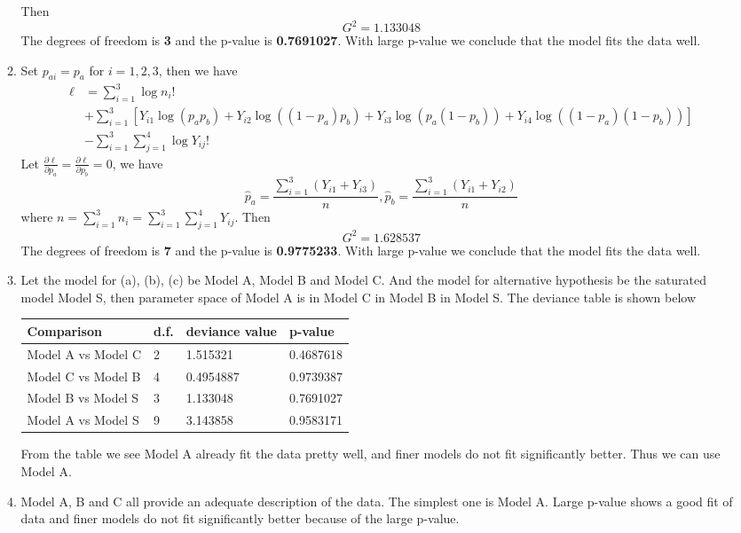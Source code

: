 \documentclass{article}
\begin{document}
\begin{enumerate}[leftmargin = 0 em, label = \arabic*., font = \bfseries]
\begin{enumerate}
		 Then 
		 \[G^2 = 1.133048\]
		 The degrees of freedom is \textbf{3} and the p-value is \textbf{0.7691027}. With large p-value we conclude that the model fits the data well.
		 
		\item 
		Set $p_{ai} = p_{a}$ for $i = 1,2,3$, then we have
		\begin{align*}
		 \ell &= \sum_{i=1}^3 \log n_i! \\
		 & + \sum_{i=1}^3 \left[Y_{i1} \log (p_{a}p_{b}) + Y_{i2}\log((1 - p_{a})p_{b}) + Y_{i3}\log(p_{a}(1 - p_{b})) + Y_{i4}\log( (1 - p_{a})(1 - p_{b}))\right]\\
		 & - \sum_{i=1}^3 \sum_{j=1}^4 \log Y_{ij}!
		 \end{align*} 
		 Let $\frac{\partial \ell}{\partial p_{a}} =  \frac{\partial \ell}{\partial p_{b}} = 0$, we have
		 \[\hat{p}_{a} = \frac{\sum_{i=1}^3 (Y_{i1} + Y_{i3})}{n}, \hat{p}_{b} = \frac{\sum_{i=1}^3 (Y_{i1} + Y_{i2})}{n} \]
		 where $n = \sum_{i=1}^3 n_i = \sum_{i=1}^3 \sum_{j=1}^4 Y_{ij}$.
		 Then 
		 \[G^2 = 1.628537\]
		 The degrees of freedom is \textbf{7} and the p-value is \textbf{0.9775233}. With large p-value we conclude that the model fits the data well.
		\item  Let the model for (a), (b), (c) be Model A, Model B and Model C. And the model for alternative hypothesis be the saturated model Model S, then parameter space of Model A is in Model C in Model B in Model S. The deviance table is shown below

		\begin{center}
		\begin{tabular}{llll}
				\textbf{Comparison} & \textbf{d.f.} &\textbf{deviance value} & \textbf{p-value}\\
				\midrule
				Model A vs Model C & 2  & 1.515321 & 0.4687618\\
				Model C vs Model B & 4 &  0.4954887 & 0.9739387\\
				Model B vs Model S & 3 &  1.133048 & 0.7691027\\
				\midrule
				Model A vs Model S & 9 & 3.143858 & 0.9583171		
		\end{tabular}
		\end{center}
		 From the table we see Model A already fit the data pretty well, and finer models do not fit significantly better. Thus we can use Model A.
		 \item 
		 Model A, B and C all provide an adequate description of the data. The simplest one is Model A. Large p-value shows a good fit of data and finer models do not fit significantly better because of the large p-value.
	\end{enumerate}


\end{enumerate}
\end{document}
